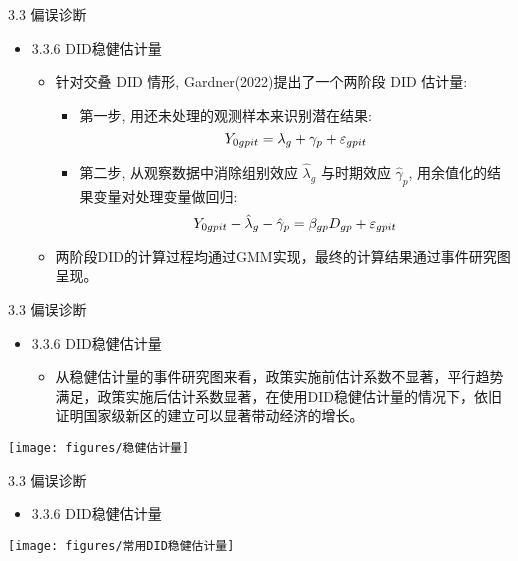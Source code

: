 \documentclass{beamer}%
\begin{document}
\begin{frame}[t]{\large 3.3 偏误诊断}
\begin{itemize}
  \item 3.3.6 DID稳健估计量
  \begin{itemize}
  \item 针对交叠 DID 情形, Gardner(2022)提出了一个两阶段 DID 估计量:
  \begin{itemize}
  \item 第一步, 用还未处理的观测样本来识别潜在结果:
    \begin{equation}
    \setlength{\abovedisplayskip}{2pt}
    \setlength{\belowdisplayskip}{2pt}
    Y_{0 g p i t}=\lambda_g+\gamma_p+\varepsilon_{g p i t}
    \end{equation}
  \item 第二步, 从观察数据中消除组别效应 $\hat{\lambda}_g$ 与时期效应 $\hat{\gamma}_p$, 用余值化的结果变量对处理变量做回归:
    \begin{equation}
    \setlength{\abovedisplayskip}{2pt}
    \setlength{\belowdisplayskip}{2pt}
     Y_{0 g p i t}-\hat{\lambda}_g-\hat{\gamma}_p=\beta_{g p} D_{g p}+\varepsilon_{g p i t}
    \end{equation}
  \end{itemize}
  \item  两阶段DID的计算过程均通过GMM实现，最终的计算结果通过事件研究图呈现。
  \end{itemize}
\end{itemize}
\end{frame}


\begin{frame}[t]{\large 3.3 偏误诊断}
\begin{itemize}
  \item 3.3.6 DID稳健估计量
  \begin{itemize}
  \item 从稳健估计量的事件研究图来看，政策实施前估计系数不显著，平行趋势满足，政策实施后估计系数显著，在使用DID稳健估计量的情况下，依旧证明国家级新区的建立可以显著带动经济的增长。
  \end{itemize}
\end{itemize}
\vspace{-0.4cm} %
\begin{center}
	\texttt{[image: figures/稳健估计量]}
\end{center}
\end{frame}

\begin{frame}[t]{\large 3.3 偏误诊断}
\begin{itemize}
  \item 3.3.6 DID稳健估计量
\end{itemize}
\vspace{-0.2cm} %
\begin{center}
	\texttt{[image: figures/常用DID稳健估计量]}
\end{center}
\end{frame}
\end{document}
